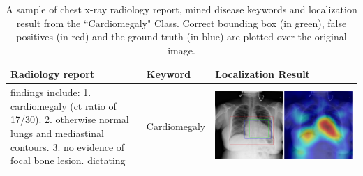 \documentclass[10pt,twocolumn,letterpaper]{article}
\begin{document}
\begin{table}
	\begin{center}
		\begin{tabular}{p{15em}|p{6em}|p{23em}}
			\hline
			Radiology report & Keyword & Localization Result\\
			\hline\hline
			findings include:
			1. cardiomegaly (ct ratio of 17/30).
			2. otherwise normal lungs and mediastinal contours.
			3. no evidence of focal bone lesion.
			dictating 
			& Cardiomegaly 
			&\vspace{0cm}\includegraphics[width=1\linewidth]{00003456_01_c_2.png} \\
			\hline
		\end{tabular}
	\end{center}
	\caption{A sample of chest x-ray radiology report, mined disease keywords and localization result from the ``Cardiomegaly" Class. Correct bounding box (in green), false positives (in red) and the ground truth (in blue) are plotted over the original image.}
	\label{tab:Loc_example_2}
\end{table}
\end{document}
